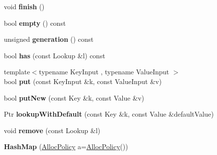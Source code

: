 \begin{DoxyCompactItemize}
\item 
\hypertarget{classjs_1_1_hash_map_a6188d758998c5666f3ef80f91a990f4c}{void {\bfseries finish} ()}\label{classjs_1_1_hash_map_a6188d758998c5666f3ef80f91a990f4c}

\item 
\hypertarget{classjs_1_1_hash_map_a3de2c4d11b6eec864257ef16b77de62c}{bool {\bfseries empty} () const }\label{classjs_1_1_hash_map_a3de2c4d11b6eec864257ef16b77de62c}

\item 
\hypertarget{classjs_1_1_hash_map_a203090158975f7a6dcab359be8789fed}{unsigned {\bfseries generation} () const }\label{classjs_1_1_hash_map_a203090158975f7a6dcab359be8789fed}

\item 
\hypertarget{classjs_1_1_hash_map_a4ff791e94be3dd0711fccfca3cab7bb5}{bool {\bfseries has} (const Lookup \&l) const }\label{classjs_1_1_hash_map_a4ff791e94be3dd0711fccfca3cab7bb5}

\item 
\hypertarget{classjs_1_1_hash_map_a17b45d78e5fbd400362300df53340bc4}{{\footnotesize template$<$typename Key\-Input , typename Value\-Input $>$ }\\bool {\bfseries put} (const Key\-Input \&k, const Value\-Input \&v)}\label{classjs_1_1_hash_map_a17b45d78e5fbd400362300df53340bc4}

\item 
\hypertarget{classjs_1_1_hash_map_aab52dabd5cddb16505b30f5680636be2}{bool {\bfseries put\-New} (const Key \&k, const Value \&v)}\label{classjs_1_1_hash_map_aab52dabd5cddb16505b30f5680636be2}

\item 
\hypertarget{classjs_1_1_hash_map_aa473493e3a444b6cee87317d7b0f9149}{Ptr {\bfseries lookup\-With\-Default} (const Key \&k, const Value \&default\-Value)}\label{classjs_1_1_hash_map_aa473493e3a444b6cee87317d7b0f9149}

\item 
\hypertarget{classjs_1_1_hash_map_aa728bda0c21c4eccd7da13fa9d38ecf8}{void {\bfseries remove} (const Lookup \&l)}\label{classjs_1_1_hash_map_aa728bda0c21c4eccd7da13fa9d38ecf8}

\item 
\hypertarget{classjs_1_1_hash_map_a92d212f4d36a44c789986050761e12e3}{{\bfseries Hash\-Map} (\hyperlink{class_alloc_policy}{Alloc\-Policy} a=\hyperlink{class_alloc_policy}{Alloc\-Policy}())}\label{classjs_1_1_hash_map_a92d212f4d36a44c789986050761e12e3}


\end{DoxyCompactItemize}
